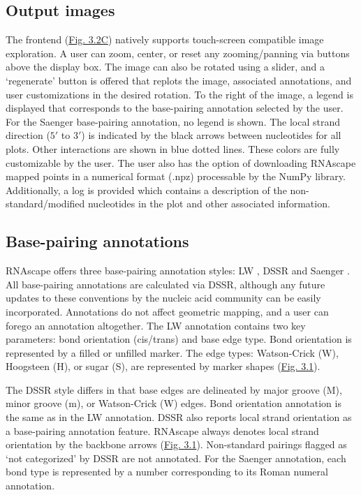 \subsection{Output images}

The frontend (\hyperref[fig:rnascape2]{Fig. 3.2C}) natively supports touch-screen compatible image exploration. A user can zoom, center, or reset any zooming/panning via buttons above the display box. The image can also be rotated using a slider, and a ‘regenerate’ button is offered that replots the image, associated annotations, and user customizations in the desired rotation. To the right of the image, a legend is displayed that corresponds to the base-pairing annotation selected by the user. For the Saenger \citep{Saenger1984} base-pairing annotation, no legend is shown. The local strand direction ($5'$ to $3'$) is indicated by the black arrows between nucleotides for all plots. Other interactions are shown in blue dotted lines. These colors are fully customizable by the user. The user also has the option of downloading RNAscape mapped points in a numerical format (.npz) processable by the NumPy \citep{harris2020array} library. Additionally, a log is provided which contains a description of the non-standard/modified nucleotides in the plot and other associated information.

\subsection{Base-pairing annotations}

RNAscape offers three base-pairing annotation styles: LW \citep{Yang2003, Leontis2001}, DSSR \citep{lu2015dssr} and Saenger \citep{Saenger1984}. All base-pairing annotations are calculated via DSSR, although any future updates to these conventions by the nucleic acid community can be easily incorporated. Annotations do not affect geometric mapping, and a user can forego an annotation altogether. The LW annotation contains two key parameters: bond orientation (cis/trans) and base edge type. Bond orientation is represented by a filled or unfilled marker. The edge types: Watson-Crick (W), Hoogsteen (H), or sugar (S), are represented by marker shapes (\hyperref[fig:rnascape1]{Fig. 3.1}).

The DSSR style differs in that base edges are delineated by major groove (M), minor groove (m), or Watson-Crick (W) edges. Bond orientation annotation is the same as in the LW \citep{Yang2003, Leontis2001} annotation. DSSR also reports local strand orientation as a base-pairing annotation feature. RNAscape always denotes local strand orientation by the backbone arrows (\hyperref[fig:rnascape1]{Fig. 3.1}). Non-standard pairings flagged as ‘not categorized’ by DSSR are not annotated. For the Saenger \citep{Saenger1984} annotation, each bond type is represented by a number corresponding to its Roman numeral annotation.

